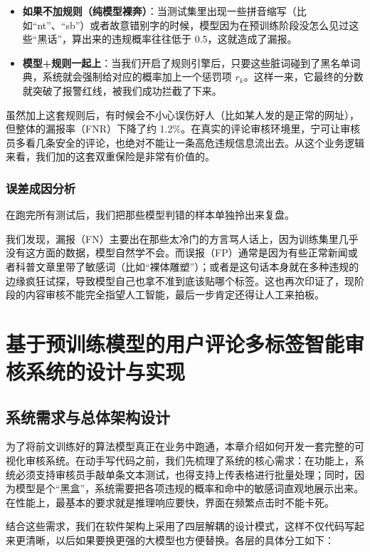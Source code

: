 \documentclass[twoside]{thesis-cls-Miya} %
\begin{document}
\begin{itemize}
	\item
	\textbf{如果不加规则（纯模型裸奔）}：当测试集里出现一些拼音缩写（比如“nt”、“sb”）或者故意错别字的时候，模型因为在预训练阶段没怎么见过这些“黑话”，算出来的违规概率往往低于 0.5，这就造成了漏报。
	\item
	\textbf{模型+规则一起上}：当我们开启了规则引擎后，只要这些脏词碰到了黑名单词典，系统就会强制给对应的概率加上一个惩罚项 $r_k$。这样一来，它最终的分数就突破了报警红线，被我们成功拦截了下来。
\end{itemize}

虽然加上这套规则后，有时候会不小心误伤好人（比如某人发的是正常的网址），但整体的漏报率（FNR）下降了约 1.2\%。在真实的评论审核环境里，宁可让审核员多看几条安全的评论，也绝对不能让一条高危违规信息流出去。从这个业务逻辑来看，我们加的这套双重保险是非常有价值的。

\subsection{误差成因分析}
在跑完所有测试后，我们把那些模型判错的样本单独拎出来复盘。

我们发现，漏报（FN）主要出在那些太冷门的方言骂人话上，因为训练集里几乎没有这方面的数据，模型自然学不会。而误报（FP）通常是因为有些正常新闻或者科普文章里带了敏感词（比如“裸体雕塑”）；或者是这句话本身就在多种违规的边缘疯狂试探，导致模型自己也拿不准到底该贴哪个标签。这也再次印证了，现阶段的内容审核不能完全指望人工智能，最后一步肯定还得让人工来拍板。


\chapter{基于预训练模型的用户评论多标签智能审核系统的设计与实现}
\section{系统需求与总体架构设计}
为了将前文训练好的算法模型真正在业务中跑通，本章介绍如何开发一套完整的可视化审核系统。在动手写代码之前，我们先梳理了系统的核心需求：在功能上，系统必须支持审核员手敲单条文本测试，也得支持上传表格进行批量处理；同时，因为模型是个“黑盒”，系统需要把各项违规的概率和命中的敏感词直观地展示出来。在性能上，最基本的要求就是推理响应要快，界面在频繁点击时不能卡死。

结合这些需求，我们在软件架构上采用了四层解耦的设计模式，这样不仅代码写起来更清晰，以后如果要换更强的大模型也方便替换。各层的具体分工如下：
\end{document}
